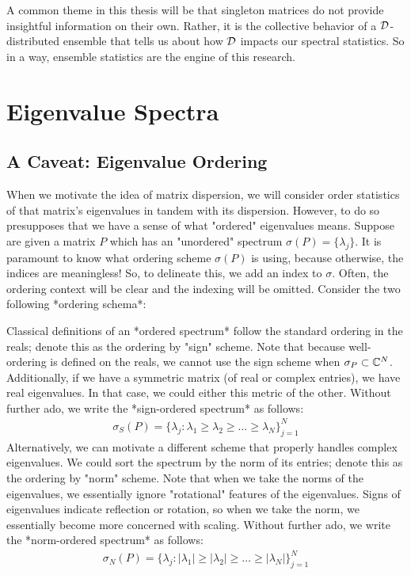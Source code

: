 A common theme in this thesis will be that singleton matrices do not provide insightful information on their own. Rather, it is the collective behavior of a $\mathcal{D}$-distributed ensemble that tells us about how $\mathcal{D}$ impacts our spectral statistics. So in a way, ensemble statistics are the engine of this research.


\section{Eigenvalue Spectra}

\subsection{A Caveat: Eigenvalue Ordering}

When we motivate the idea of matrix dispersion, we will consider order statistics of that matrix's eigenvalues in tandem with its dispersion. However, to do so presupposes that we have a sense of what "ordered" eigenvalues means. Suppose are given a matrix $P$ which has an "unordered" spectrum $\sigma(P) = \{\lambda_j\}$. It is paramount to know what ordering scheme $\sigma(P)$ is using, because otherwise, the indices are meaningless! So, to delineate this, we add an index to $\sigma$. Often, the ordering context will be clear and the indexing will be omitted. Consider the two following *ordering schema*:

Classical definitions of an *ordered spectrum* follow the standard ordering in the reals; denote this as the ordering by "sign" scheme. Note that because well-ordering is defined on the reals, we cannot use the sign scheme when $\sigma_P \subset \mathbb{C}^N$. Additionally, if we have a symmetric matrix (of real or complex entries), we have real eigenvalues. In that case, we could either this metric of the other. Without further ado, we write the *sign-ordered spectrum* as follows:
\begin{align*}
\sigma_S(P) = \{\lambda_j : \lambda_1 \geq \lambda_2 \geq \dots \geq \lambda_N\}_{j = 1}^N
\end{align*}
Alternatively, we can motivate a different scheme that properly handles complex eigenvalues. We could sort the spectrum by the norm of its entries; denote this as the ordering by "norm" scheme. Note that when we take the norms of the eigenvalues, we essentially ignore "rotational" features of the eigenvalues. Signs of eigenvalues indicate reflection or rotation, so when we take the norm, we essentially become more concerned with scaling. Without further ado, we write the *norm-ordered spectrum* as follows:
\begin{align*}
\sigma_N(P) = \{\lambda_j : |\lambda_1| \geq |\lambda_2| \geq \dots \geq |\lambda_N|\}_{j = 1}^N
\end{align*}

